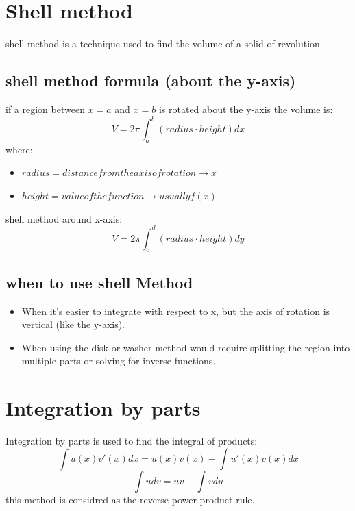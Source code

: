 \documentclass{article}
\begin{document}
                \section{Shell method}
                            shell method is a technique used to find the volume of a solid of revolution 
                            \subsection{shell method formula (about the y-axis)}
                                if a region between \(x = a\) and \(x = b\) is rotated about the y-axis the volume is: 
                                    \[V = 2\pi \int_{a}^{b} (radius \cdot height) dx\]
                                where: 
                                \begin{itemize}
                                    \item \(radius = distance from the axis of rotation \rightarrow x\)
                                    \item \(height = value of the function \rightarrow usually f(x)\)
                                \end{itemize}
                                shell method around x-axis: 
                                        \[V = 2\pi \int_{c}^{d} (radius \cdot height) dy\]
                            \subsection{when to use shell Method}
                            \begin{itemize}
                                \item When it's easier to integrate with respect to x, but the axis of rotation is vertical (like the y-axis).
                                \item When using the disk or washer method would require splitting the region into multiple parts or solving for inverse functions.
                            \end{itemize}
                \section{Integration by parts}
                            Integration by parts is used to find the integral of products: 
                            \[\int u(x)v'(x)dx = u(x)v(x) - \int u'(x)v(x)dx \]
                            \[\int u dv = uv - \int v du\]
                            this method is considred as the reverse power product rule.
\end{document}
